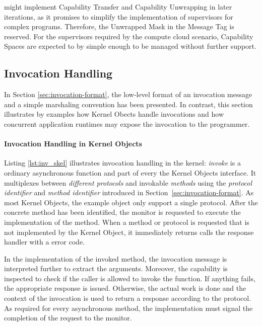\mythos might implement Capability Transfer and Capability Unwrapping in later iterations, as it promises to simplify the implementation of supervisors for complex programs. Therefore, the Unwrapped Mask in the Message Tag is reserved. For the supervisors required by the compute cloud scenario, Capability Spaces are expected to by simple enough to be managed without further support.


\subsection{Invocation Handling}
\label{sec:invocation-handling}

In Section \ref{sec:invocation-format}, the low-level format of an invocation message and a simple marshaling convention has been presented. In contrast, this section illustrates by examples how Kernel Obects handle invocations and how concurrent application runtimes may expose the invocation to the programmer.

\paragraph{Invocation Handling in Kernel Objects}

Listing \ref{lst:inv_skel} illustrates invocation handling in the kernel: \emph{invoke} is a ordinary asynchronous function and part of every the Kernel Objects interface. It multiplexes between \emph{different protocols} and invokable \emph{methods} using the \emph{protocol identifier} and \emph{method identifier} introduced in Section~\ref{sec:invocation-format}. As most Kernel Objects, the example object only support a single protocol. After the concrete method has been identified, the monitor is requested to execute the implementation of the method. When a method or protocol is requested that is not implemented by the Kernel Object, it immediately returns calls the response handler with a error code.

In the implementation of the invoked method, the invocation message is interpreted further to extract the arguments.
Moreover, the capability is inspected to check if the caller is allowed to invoke the function. If anything fails, the appropriate response  is issued. Otherwise, the actual work is done and the context of the invocation is used to return a response according to the protocol. As required for every asynchronous method, the implementation must signal the completion of the request to the monitor.

